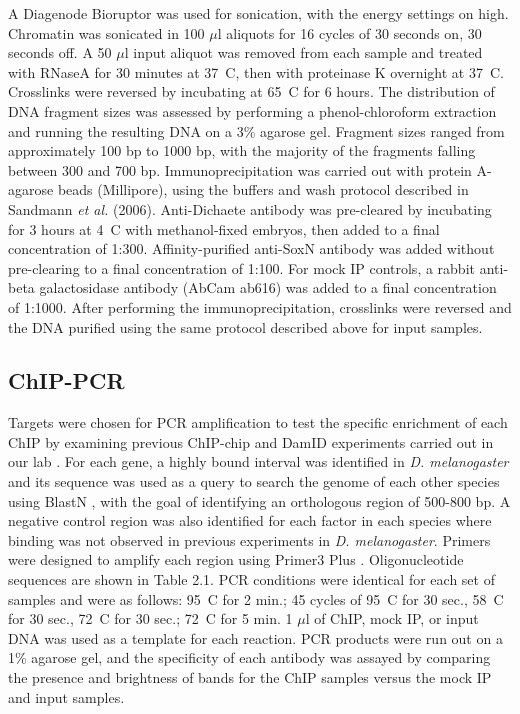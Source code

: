 A Diagenode Bioruptor was used for sonication, with the energy settings on high. Chromatin was sonicated in 100 \(\mu\)l aliquots for 16 cycles of 30 seconds on, 30 seconds off. A 50 \(\mu\)l input aliquot was removed from each sample and treated with RNaseA for 30 minutes at 37\degree~C, then with proteinase K overnight at 37\degree~C. Crosslinks were reversed by incubating at 65\degree~C for 6 hours. The distribution of DNA fragment sizes was assessed by performing a phenol-chloroform extraction and running the resulting DNA on a 3\% agarose gel. Fragment sizes ranged from approximately 100 bp to 1000 bp, with the majority of the fragments falling between 300 and 700 bp. Immunoprecipitation was carried out with protein A-agarose beads (Millipore), using the buffers and wash protocol described in Sandmann \emph{et al.} (2006). Anti-Dichaete antibody was pre-cleared by incubating for 3 hours at 4\degree~C with methanol-fixed embryos, then added to a final concentration of 1:300. Affinity-purified anti-SoxN antibody was added without pre-clearing to a final concentration of 1:100. For mock IP controls, a rabbit anti-beta galactosidase antibody (AbCam ab616) was added to a final concentration of 1:1000. After performing the immunoprecipitation, crosslinks were reversed and the DNA purified using the same protocol described above for input samples.

\subsection{ChIP-PCR}
Targets were chosen for PCR amplification to test the specific enrichment of each ChIP by examining previous ChIP-chip and DamID experiments carried out in our lab \citep{aleksic_role_2013,ferrero_soxneuro_2014}. For each gene, a highly bound interval was identified in \emph{D. melanogaster} and its sequence was used as a query to search the genome of each other species using BlastN \citep{altschul_basic_1990}, with the goal of identifying an orthologous region of 500-800 bp. A negative control region was also identified for each factor in each species where binding was not observed in previous experiments in \emph{D. melanogaster}. Primers were designed to amplify each region using Primer3 Plus \citep{untergasser_primer3plus_2007}. Oligonucleotide sequences are shown in Table 2.1. PCR conditions were identical for each set of samples and were as follows: 95\degree~C for 2 min.; 45 cycles of 95\degree~C for 30 sec., 58\degree~C for 30 sec., 72\degree~C for 30 sec.; 72\degree~C for 5 min. 1 \(\mu\)l of ChIP, mock IP, or input DNA was used as a template for each reaction. PCR products were run out on a 1\% agarose gel, and the specificity of each antibody was assayed by comparing the presence and brightness of bands for the ChIP samples versus the mock IP and input samples.\\

